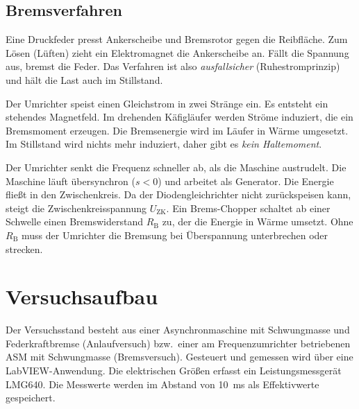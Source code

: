 \documentclass[11pt,a4paper]{article}
\begin{document}
\subsection{Bremsverfahren}
\begin{description}[style=nextline,leftmargin=1em]
\item[Federkraftbremse] Eine Druckfeder presst Ankerscheibe und Bremsrotor gegen die
  Reibfläche. Zum Lösen (Lüften) zieht ein Elektromagnet die Ankerscheibe an.
  Fällt die Spannung aus, bremst die Feder. Das Verfahren ist also
  \emph{ausfallsicher} (Ruhestromprinzip) und hält die Last auch im Stillstand.
\item[Gleichstrombremsung] Der Umrichter speist einen Gleichstrom in zwei Stränge ein.
  Es entsteht ein stehendes Magnetfeld. Im drehenden Käfigläufer werden Ströme
  induziert, die ein Bremsmoment erzeugen. Die Bremsenergie wird im Läufer in Wärme
  umgesetzt. Im Stillstand wird nichts mehr induziert, daher gibt es
  \emph{kein Haltemoment}.
\item[Generatorisches Bremsen] Der Umrichter senkt die Frequenz schneller ab,
  als die Maschine austrudelt. Die Maschine läuft übersynchron
  ($s<0$) und arbeitet als Generator. Die Energie fließt in den Zwischenkreis. Da der
  Diodengleichrichter nicht zurückspeisen kann, steigt die Zwischenkreisspannung
  $U_\mathrm{ZK}$. Ein Brems-Chopper schaltet ab einer Schwelle einen
  Bremswiderstand $R_\mathrm B$ zu, der die Energie in Wärme umsetzt. Ohne $R_\mathrm B$ muss
  der Umrichter die Bremsung bei Überspannung unterbrechen oder strecken.
\end{description}

\section{Versuchsaufbau}
Der Versuchsstand besteht aus einer Asynchronmaschine mit Schwungmasse und
Federkraftbremse (Anlaufversuch) bzw.\ einer am Frequenzumrichter betriebenen ASM
mit Schwungmasse (Bremsversuch). Gesteuert und gemessen wird über eine
LabVIEW-Anwendung. Die elektrischen Größen erfasst ein Leistungsmessgerät LMG640.
Die Messwerte werden im Abstand von \SI{10}{ms} als Effektivwerte gespeichert.
\end{document}
